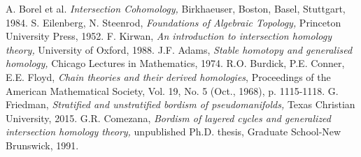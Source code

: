 \documentclass{scrreprt}
\begin{document}
\begin{thebibliography}
A. Borel et al. \textit{Intersection Cohomology,} Birkhaeuser, Boston, Basel, Stuttgart, 1984.
S. Eilenberg, N. Steenrod, \textit{Foundations of Algebraic Topology,} Princeton University Press, 1952.
F. Kirwan, \textit{An introduction to intersection homology theory,} University of Oxford, 1988.
J.F. Adams, \textit{Stable homotopy and generalised homology,} Chicago Lectures in Mathematics, 1974.
R.O. Burdick, P.E. Conner, E.E. Floyd, \textit{Chain theories and their derived homologies},  Proceedings of the American Mathematical Society, Vol. 19, No. 5 (Oct., 1968), p. 1115-1118.
G. Friedman, \textit{Stratified and unstratified bordism of pseudomanifolds,} 	Texas Christian University, 2015.
G.R. Comezana, \textit{Bordism of layered cycles and generalized intersection homology theory,} unpublished Ph.D. thesis, Graduate School-New Brunswick, 1991.
\end{thebibliography}
\end{document}
